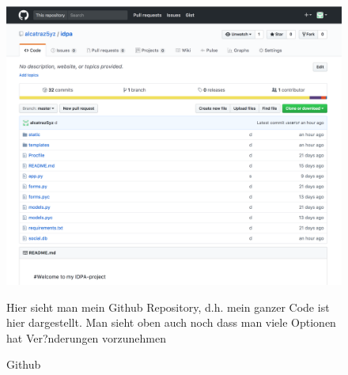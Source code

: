 \documentclass{article}
\begin{document}
\begin{figure}[ht]
    \centering
    \includegraphics[width=.7\linewidth]{github-repo}
    \caption{Github}
    \label{fig:sub1}{Hier sieht man mein Github Repository, d.h. mein ganzer Code ist hier dargestellt.
    Man sieht oben auch noch dass man viele Optionen hat Ver?nderungen vorzunehmen}
    \end{figure}


\cleardoublepage











%
%
%
\end{document}
